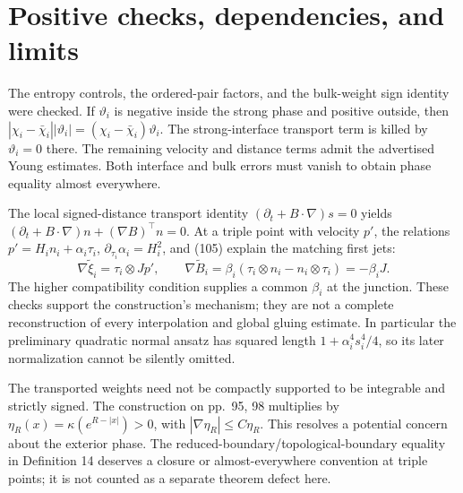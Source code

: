 \documentclass[10pt]{article}
\begin{document}
\section*{Positive checks, dependencies, and limits}
The entropy controls, the ordered-pair factors, and the bulk-weight sign identity were checked. If \(\vartheta_i\) is negative inside the strong phase and positive outside, then \(|\chi_i-\bar\chi_i||\vartheta_i|=(\chi_i-\bar\chi_i)\vartheta_i\). The strong-interface transport term is killed by \(\vartheta_i=0\) there. The remaining velocity and distance terms admit the advertised Young estimates. Both interface and bulk errors must vanish to obtain phase equality almost everywhere.\par
The local signed-distance transport identity \((\partial_t+B\cdot\nabla)s=0\) yields \((\partial_t+B\cdot\nabla)n+(\nabla B)^\top n=0\). At a triple point with velocity \(p'\), the relations \(p'=H_i n_i+\alpha_i\tau_i\), \(\partial_{\tau_i}\alpha_i=H_i^2\), and (105) explain the matching first jets: \[\nabla\widetilde\xi_i=\tau_i\otimes Jp',
 \qquad
 \nabla\widetilde B_i
 =\beta_i(\tau_i\otimes n_i-n_i\otimes\tau_i)=-\beta_iJ .\] The higher compatibility condition supplies a common \(\beta_i\) at the junction. These checks support the construction’s mechanism; they are not a complete reconstruction of every interpolation and global gluing estimate. In particular the preliminary quadratic normal ansatz has squared length \(1+\alpha_i^4s_i^4/4\), so its later normalization cannot be silently omitted.\par
The transported weights need not be compactly supported to be integrable and strictly signed. The construction on pp. 95, 98 multiplies by \(\eta_R(x)=\kappa(e^{R-|x|})>0\), with \(|\nabla\eta_R|\le C\eta_R\). This resolves a potential concern about the exterior phase. The reduced-boundary/topological-boundary equality in Definition 14 deserves a closure or almost-everywhere convention at triple points; it is not counted as a separate theorem defect here.\par
\end{document}
